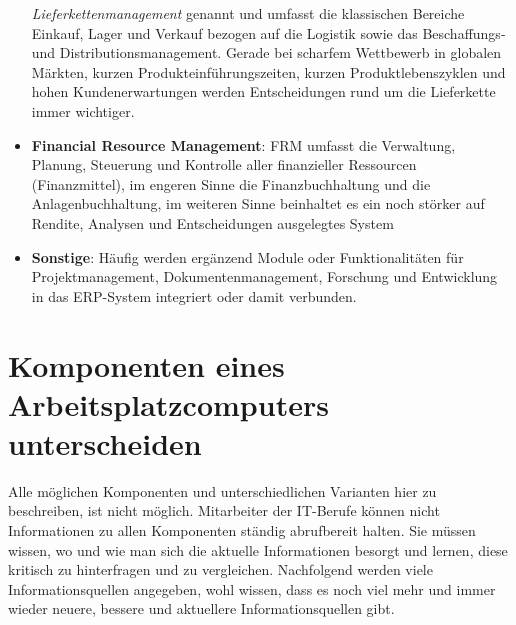 \documentclass[a4paper, 12pt]{report}
\begin{document}
\begin{multicols}{2}
\begin{itemize}
	\emph{Lieferkettenmanagement} genannt und umfasst die klassischen
	Bereiche Einkauf, Lager und Verkauf bezogen auf die Logistik sowie das
	Beschaffungs- und Distributionsmanagement. Gerade bei scharfem
	Wettbewerb in globalen Märkten, kurzen Produkteinführungszeiten, kurzen
	Produktlebenszyklen und hohen Kundenerwartungen werden Entscheidungen
	rund um die Lieferkette immer wichtiger.
    \item \textbf{Financial Resource Management}: FRM umfasst die Verwaltung,
	Planung, Steuerung und Kontrolle aller finanzieller Ressourcen
	(Finanzmittel), im engeren Sinne die Finanzbuchhaltung und die
	Anlagenbuchhaltung, im weiteren Sinne beinhaltet es ein noch störker auf
	Rendite, Analysen und Entscheidungen ausgelegtes System
    \item \textbf{Sonstige}: Häufig werden ergänzend Module oder
	Funktionalitäten für Projektmanagement, Dokumentenmanagement, Forschung
	und Entwicklung in das ERP-System integriert oder damit verbunden.
\end{itemize}

\section{Komponenten eines Arbeitsplatzcomputers unterscheiden}

Alle möglichen Komponenten und unterschiedlichen Varianten hier zu beschreiben,
ist nicht möglich. Mitarbeiter der IT-Berufe können nicht Informationen zu allen
Komponenten ständig abrufbereit halten. Sie müssen wissen, wo und wie man sich
die aktuelle Informationen besorgt und lernen, diese kritisch zu hinterfragen
und zu vergleichen. Nachfolgend werden viele Informationsquellen angegeben, wohl
wissen, dass es noch viel mehr und immer wieder neuere, bessere und aktuellere
Informationsquellen gibt. \\


\end{multicols}
\end{document}
